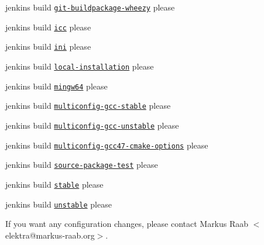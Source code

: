 \begin{DoxyItemize}
\item jenkins build \href{http://build.libelektra.org:8080/job/elektra-git-buildpackage-wheezy/}{\tt git-\/buildpackage-\/wheezy} please
\item jenkins build \href{http://build.libelektra.org:8080/job/elektra-icc/}{\tt icc} please
\item jenkins build \href{http://build.libelektra.org:8080/job/elektra-ini-mergerequests/}{\tt ini} please
\item jenkins build \href{http://build.libelektra.org:8080/job/elektra-local-installation/}{\tt local-\/installation} please
\item jenkins build \href{http://build.libelektra.org:8080/job/elektra-gcc-configure-mingw-w64/}{\tt mingw64} please
\item jenkins build \href{http://build.libelektra.org:8080/job/elektra-multiconfig-gcc-stable/}{\tt multiconfig-\/gcc-\/stable} please
\item jenkins build \href{http://build.libelektra.org:8080/job/elektra-multiconfig-gcc-unstable/}{\tt multiconfig-\/gcc-\/unstable} please
\item jenkins build \href{http://build.libelektra.org:8080/job/elektra-multiconfig-gcc47-cmake-options/}{\tt multiconfig-\/gcc47-\/cmake-\/options} please
\item jenkins build \href{http://build.libelektra.org:8080/job/elektra-source-package-test/}{\tt source-\/package-\/test} please
\item jenkins build \href{http://build.libelektra.org:8080/job/elektra-mergerequests-stable/}{\tt stable} please
\item jenkins build \href{http://build.libelektra.org:8080/job/elektra-mergerequests-unstable/}{\tt unstable} please
\end{DoxyItemize}

If you want any configuration changes, please contact {\ttfamily Markus Raab $<$elektra@markus-\/raab.\+org$>$}. 